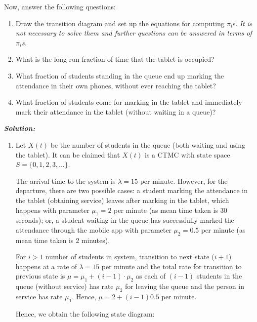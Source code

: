 \documentclass[12pt, oneside]{article}
\begin{document}
\begin{enumerate}
Now, answer the following questions:
\begin{enumerate}[label=(\alph*)]
\item Draw the transition diagram and set up the equations for computing $\pi_i$s. \textit{It is not necessary to solve them and further questions can be answered in terms of $\pi_i$s.}

\item What is the long-run fraction of time that the tablet is occupied?
\item What fraction of students standing in the queue end up marking the attendance in their own phones, without ever reaching the tablet?
\item What fraction of students come for marking in the tablet and immediately mark their attendance in the tablet (without waiting in a queue)?
\end{enumerate}

\textbf{\textit{Solution:}}

\begin{enumerate}[label=(\alph*)]
\item

Let $X(t)$ be the number of students in the queue (both waiting and using the tablet). It can be claimed that $X(t)$ is a CTMC with state space $S=\{0,1,2,3,...\}$.

The arrival time to the system is $\lambda = 15$ per minute. However, for the departure, there are two possible cases: a student marking the attendance in the tablet (obtaining service) leaves after marking in the tablet, which happens with parameter $\mu_1 = 2$ per minute (as mean time taken is 30 seconds); or, a student waiting in the queue has successfully marked the attendance through the mobile app with parameter $\mu_2 = 0.5$ per minute (as mean time taken is 2 minutes).

For $i>1$ number of students in system, transition to next state ($i+1$) happens at a rate of $\lambda = 15$ per minute and the total rate for transition to previous state is $\mu = \mu_1 + (i-1)\cdot\mu_2$ as each of $(i-1)$ students in the queue (without service) has rate $\mu_2$ for leaving the queue and the person in service has rate $\mu_1$. Hence, $\mu = 2 + (i-1)0.5$ per minute.

Hence, we obtain the following state diagram:

\begin{figure}[!h]
\centering
{}
\end{figure}
\end{enumerate}
\end{enumerate}
\end{document}
